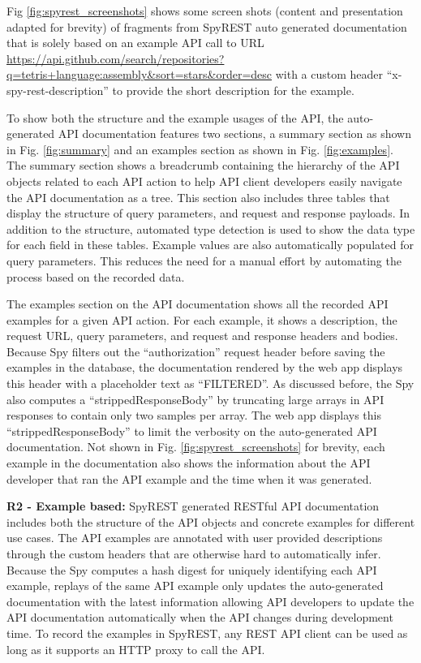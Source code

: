 \documentclass[conference]{IEEEtran}
\begin{document}
Fig \ref{fig:spyrest_screenshots} shows some screen shots  (content and presentation adapted for brevity) of fragments from SpyREST auto generated documentation that is solely based on an example API call to URL \url{https://api.github.com/search/repositories?q=tetris+language:assembly&sort=stars&order=desc} with a custom header ``x-spy-rest-description'' to provide the short description for the example.

To show both the structure and the example usages of the API, the auto-generated API documentation features two sections, a summary section as shown in Fig. \ref{fig:summary} and an examples section as shown in Fig. \ref{fig:examples}. The summary section shows a breadcrumb containing the hierarchy of the API objects related to each API action to help API client developers easily navigate the API documentation as a tree. This section also includes three tables that display the structure of query parameters, and request and response payloads. In addition to the structure, automated type detection is used to show the data type for each field in these tables. Example values are also automatically populated for query parameters. This reduces the need for a manual effort by automating the process based on the recorded data.

The examples section on the API documentation shows all the recorded API examples for a given API action. For each example, it shows a description, the request URL, query parameters, and request and response headers and bodies. Because Spy filters out the ``authorization'' request header before saving the examples in the database, the documentation rendered by the web app displays this header with a placeholder text as ``FILTERED''. As discussed before, the Spy also computes a ``strippedResponseBody'' by truncating large arrays in API responses to contain only two samples per array. The web app displays this ``strippedResponseBody'' to limit the verbosity on the auto-generated API documentation. Not shown in Fig. \ref{fig:spyrest_screenshots} for brevity, each example in the documentation also shows the information about the API developer that ran the API example and the time when it was generated.

\textbf{R2 - Example based:} SpyREST generated RESTful API documentation includes both the structure of the API objects and concrete examples for different use cases. The API examples are annotated with user provided descriptions through the custom headers that are otherwise hard to automatically infer. Because the Spy computes a hash digest for uniquely identifying each API example, replays of the same API example only updates the auto-generated documentation with the latest information allowing API developers to update the API documentation automatically when the API changes during development time. To record the examples in SpyREST, any REST API client can be used as long as it supports an HTTP proxy to call the API.
\end{document}
